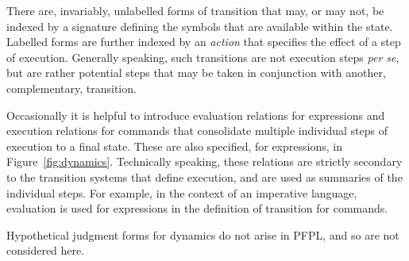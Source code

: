 \documentclass[11pt]{article}
\begin{document}
There are, invariably, unlabelled forms of transition that may, or may not, be indexed by a signature defining the symbols that are available within the state.  Labelled forms are further indexed by an \emph{action} that specifies the effect of a step of execution.  Generally speaking, such transitions are not execution steps \textit{per se}, but are rather potential steps that may be taken in conjunction with another, complementary, transition.

\smallskip

Occasionally it is helpful to introduce evaluation relations for expressions and execution relations for commands that consolidate multiple individual steps of execution to a final state.  These are also specified, for expressions, in Figure~\ref{fig:dynamics}.  Technically speaking, these relations are strictly secondary to the transition systems that define execution, and are used as summaries of the individual steps.  For example, in the context of an imperative language, evaluation is used for expressions in the definition of transition for commands.

\smallskip

Hypothetical judgment forms for dynamics do not arise in \textsf{PFPL}, and so are not considered here.
\end{document}
